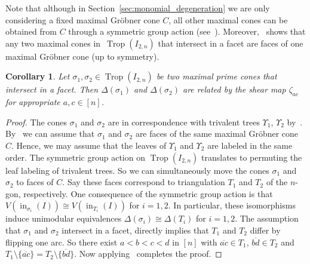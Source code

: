 \documentclass[pdftex]{sigma}%
\newtheorem{Corollary}[Theorem]{Corollary}
\numberwithin{equation}{section}
\DeclareMathOperator{\init}{in}
\DeclareMathOperator{\trop}{Trop}
\DeclareMathOperator{\ttrop}{\mathbb{T}rop}
\begin{document}
Note that although in Section~\ref{sec:monomial_degeneration} we are only considering a fixed maximal Gr\"obner cone $C$, all other maximal cones can be obtained from $C$ through a symmetric group action (see~\cite[Second Proof of $\supseteq$ Theorem~4.3.5]{M-S}).
Moreover,~\cite[Lemma~5.13]{EH-NObodies} shows that any two maximal cones in~$\trop(I_{2,n})$ that intersect in a facet are faces of one maximal Gr\"obner cone (up to symmetry).


\begin{Corollary}
Let $\sigma_1,\sigma_2\in\trop(I_{2,n})$ be two maximal prime cones that intersect in a facet. Then $\Delta(\sigma_1)$ and $\Delta(\sigma_2)$ are %
related by the shear map $\zeta_{ac}$ for appropriate $a,c\in [n]$.
\end{Corollary}
\begin{proof}
The cones $\sigma_1$ and $\sigma_2$ are in correspondence with trivalent trees $\Upsilon_{1}$, $\Upsilon_{2}$ by~.
By~\cite[Lemma~5.13]{EH-NObodies} we can assume that $\sigma_1$ and $\sigma_2$ are faces of the same maximal Gr\"obner cone~$C$.
Hence, we may assume that the leaves of $\Upsilon_{1}$ and $\Upsilon_{2}$ are labeled in the same order.
The symmetric group action on $\trop(I_{2,n})$
translates to permuting the leaf labeling of trivalent trees.
So we can simultaneously move the cones $\sigma_1$ and $\sigma_2$ to faces of $C$.
Say these faces correspond to triangulation $T_1$ and $T_2$ of the $n$-gon, respectively.
One consequence of the symmetric group action is that $V(\init_{\sigma_i}(I))\cong V(\init_{T_i}(I))$ for $i=1,2$.
In particular, these isomorphisms induce unimodular equivalences
$\Delta(\sigma_i)\cong \Delta(T_i)$ for $i=1,2$.
The assumption that $\sigma_1$ and $\sigma_2$ intersect in a facet, directly implies that $T_1$ and $T_2$ differ by flipping one arc.
So there exist $a<b<c<d$ in $[n]$ with ${\overline{ac}}\in T_1$, $\overline{bd}\in T_2$ and $T_1\setminus \{\overline{ac}\}=T_2\setminus\{\overline{bd}\}$.
Now applying~ completes the proof.
\end{proof}
\end{document}
